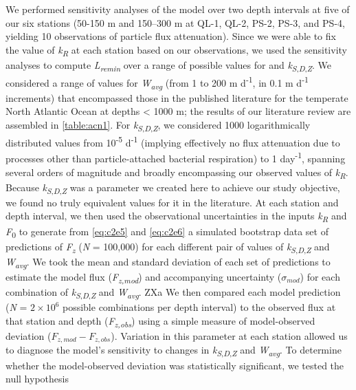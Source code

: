 We performed sensitivity analyses of the model over two depth intervals at five of our six stations (50-150 m and 150--300 m at QL-1, QL-2, PS-2, PS-3, and PS-4, yielding 10 observations of particle flux attenuation). Since we were able to fix the value of \emph{k\textsubscript{R}} at each station based on our observations, we used the sensitivity analyses to compute \emph{L\textsubscript{remin}} over a range of possible values for and \emph{k\textsubscript{S}}\textsubscript{,\emph{D},\emph{Z}}. We considered a range of values for \emph{W\textsubscript{avg}} (from 1 to 200 m d\textsuperscript{-1}, in 0.1 m d\textsuperscript{-1} increments) that encompassed those in the published literature for the temperate North Atlantic Ocean at depths \textless{} 1000 m; the results of our literature review are assembled in \autoref{table:acn1}. For \emph{k\textsubscript{S}}\textsubscript{,\emph{D},\emph{Z}}, we considered 1000 logarithmically distributed values from 10\textsuperscript{-5} d\textsuperscript{-1} (implying effectively no flux attenuation due to processes other than particle-attached bacterial respiration) to 1 day\textsuperscript{-1}, spanning several orders of magnitude and broadly encompassing our observed values of \emph{k\textsubscript{R}}. Because \emph{k\textsubscript{S}}\textsubscript{,\emph{D},\emph{Z}} was a parameter we created here to achieve our study objective, we found no truly equivalent values for it in the literature. At each station and depth interval, we then used the observational uncertainties in the inputs \emph{k\textsubscript{R}} and \emph{F}\textsubscript{0} to generate from \autoref{eq:c2e5} and \autoref{eq:c2e6} a simulated bootstrap data set of predictions of \emph{F\textsubscript{z}} (\emph{N} = 100,000) for each different pair of values of \emph{k\textsubscript{S}}\textsubscript{,\emph{D},\emph{Z}} and \emph{W\textsubscript{avg}}. We took the mean and standard deviation of each set of predictions to estimate the model flux (\emph{F\textsubscript{z}\textsubscript{,mod}}) and accompanying uncertainty ($\sigma_{mod}$) for each combination of \emph{k\textsubscript{S}}\textsubscript{,\emph{D},\emph{Z}} and \emph{W\textsubscript{avg}}.
ZXa
We then compared each model prediction (\emph{N} = $2\times10^6$ possible combinations per depth interval) to the observed flux at that station and depth (\emph{F\textsubscript{z}\textsubscript{,obs}}) using a simple measure of model-observed deviation (${F_{z,mod}} - {F_{z,obs}}$). Variation in this parameter at each station allowed us to diagnose the model's sensitivity to changes in \emph{k\textsubscript{S}}\textsubscript{,\emph{D},\emph{Z}} and \emph{W\textsubscript{avg}}. To determine whether the model-observed deviation was statistically significant, we tested the null hypothesis
